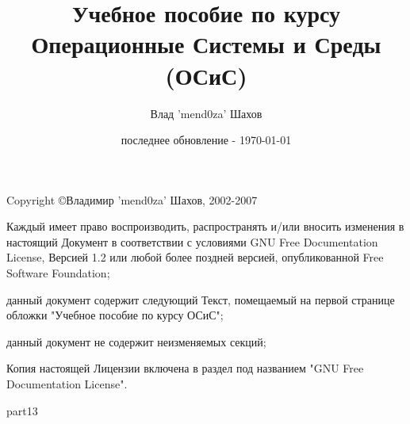 \documentclass[11pt,a4paper,twoside]{book}
\title{Учебное пособие по курсу Операционные Системы и Среды (ОСиС)}
\author{Влад 'mend0za' Шахов}
\date{последнее обновление - \today}
\begin{document}
\frontmatter

\maketitle

Copyright \copyright Владимир 'mend0za' Шахов, 2002-2007
\bigskip

Каждый имеет право воспроизводить, распространять и/или вносить изменения в настоящий Документ в соответствии с условиями GNU Free Documentation License, Версией 1.2 или любой более поздней версией, опубликованной Free Software Foundation;

данный документ содержит следующий Текст, помещаемый на первой странице обложки "Учебное пособие по курсу ОСиС";

данный документ не содержит неизменяемых секций;

Копия настоящей Лицензии включена в раздел под названием "GNU Free Documentation License".

\bigskip

\tableofcontents

\mainmatter






 







%



 {part13}

\backmatter
{}



\end{document}
